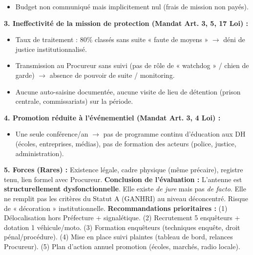 \documentclass[11pt]{article}
\begin{document}
\begin{exoresolu}
\begin{itemize}
        \item Budget non communiqué mais implicitement nul (frais de mission non payés).
    \end{itemize}
    \textbf{3. Ineffectivité de la mission de protection (Mandat Art. 3, 5, 17 Loi) :}
    \begin{itemize}
        \item Taux de traitement : 80\% classés sans suite « faute de moyens » $\rightarrow$ déni de justice institutionnalisé.
        \item Transmission au Procureur sans suivi (pas de rôle de « watchdog » / chien de garde) $\rightarrow$ absence de pouvoir de suite / monitoring.
        \item Aucune auto-saisine documentée, aucune visite de lieu de détention (prison centrale, commissariats) sur la période.
    \end{itemize}
    \textbf{4. Promotion réduite à l'événementiel (Mandat Art. 3, 4 Loi) :}
    \begin{itemize}
        \item Une seule conférence/an $\rightarrow$ pas de programme continu d'éducation aux DH (écoles, entreprises, médias), pas de formation des acteurs (police, justice, administration).
    \end{itemize}
    \textbf{5. Forces (Rares) :} Existence légale, cadre physique (même précaire), registre tenu, lien formel avec Procureur.
    \textbf{Conclusion de l'évaluation :} L'antenne est \textbf{structurellement dysfonctionnelle}. Elle existe \emph{de jure} mais pas \emph{de facto}. Elle ne remplit pas les critères du Statut A (GANHRI) au niveau déconcentré. Risque de « décoration » institutionnelle.
    \textbf{Recommandations prioritaires :} (1) Délocalisation hors Préfecture + signalétique. (2) Recrutement 5 enquêteurs + dotation 1 véhicule/moto. (3) Formation enquêteurs (techniques enquête, droit pénal/procédure). (4) Mise en place suivi plaintes (tableau de bord, relances Procureur). (5) Plan d'action annuel promotion (écoles, marchés, radio locale).
\end{exoresolu}
\end{document}
